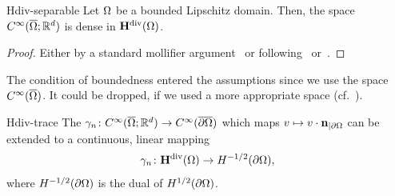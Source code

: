 \begin{Theorem}{Hdiv-separable}
  Let $\Omega$ be a bounded Lipschitz domain. Then, the space
  $C^\infty(\overline{\Omega};\mathbb R^d)$ is dense in $\mathbf H^{\text{div}}(\Omega)$.
\end{Theorem}

\begin{proof}
  Either by a standard mollifier argument~\cite{AdamsFournier03} or
  following~\cite[Theorem 2.4]{GiraultRaviart86} or~\cite[Theorem 3.22]{Monk03}.
\end{proof}

\begin{remark}
  The condition of boundedness entered the assumptions since we use
  the space $C^\infty(\overline{\Omega})$. It could be dropped, if we
  used a more appropriate space (cf.~\cite[Theorem
  2.4]{GiraultRaviart86}).
\end{remark}

\begin{Theorem}{Hdiv-trace}
  The 
  $\gamma_n\colon C^\infty(\overline{\Omega};\mathbb R^d) \to
  C^\infty(\overline{\partial\Omega})$
  which maps $v\mapsto v\cdot\mathbf n_{|\partial\Omega}$ can be extended to a
  continuous, linear mapping
  \begin{gather}
    \gamma_n\colon \mathbf H^{\text{div}}(\Omega) \to H^{-1/2}(\partial\Omega),
  \end{gather}
  where $H^{-1/2}(\partial\Omega)$ is the dual of $H^{1/2}(\partial\Omega)$.
\end{Theorem}

